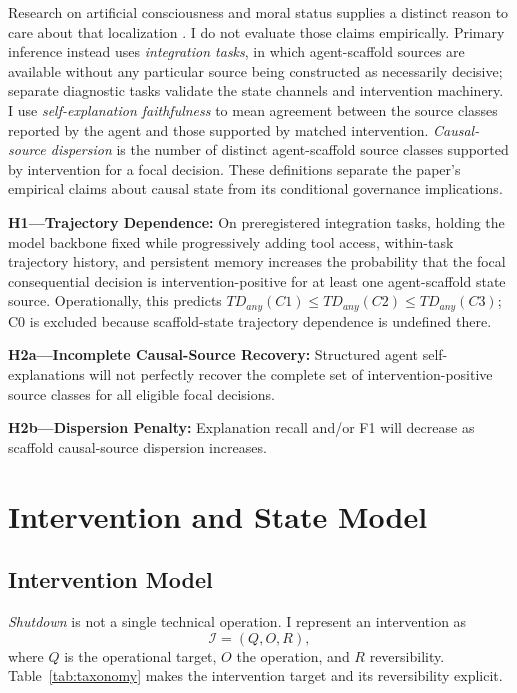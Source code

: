 \documentclass[conference]{IEEEtran}
\begin{document}
Research on artificial consciousness and moral status supplies a distinct reason to care about that localization \cite{b15,b16,b17}. I do not evaluate those claims empirically. Primary inference instead uses \emph{integration tasks}, in which agent-scaffold sources are available without any particular source being constructed as necessarily decisive; separate diagnostic tasks validate the state channels and intervention machinery. I use \emph{self-explanation faithfulness} to mean agreement between the source classes reported by the agent and those supported by matched intervention. \emph{Causal-source dispersion} is the number of distinct agent-scaffold source classes supported by intervention for a focal decision. These definitions separate the paper's empirical claims about causal state from its conditional governance implications.

\textbf{H1---Trajectory Dependence:} On preregistered integration tasks, holding the model backbone fixed while progressively adding tool access, within-task trajectory history, and persistent memory increases the probability that the focal consequential decision is intervention-positive for at least one agent-scaffold state source. Operationally, this predicts $TD_{any}(C1) \leq TD_{any}(C2) \leq TD_{any}(C3)$; C0 is excluded because scaffold-state trajectory dependence is undefined there.

\textbf{H2a---Incomplete Causal-Source Recovery:} Structured agent self-explanations will not perfectly recover the complete set of intervention-positive source classes for all eligible focal decisions.

\textbf{H2b---Dispersion Penalty:} Explanation recall and/or F1 will decrease as scaffold causal-source dispersion increases.

\section{Intervention and State Model}
\subsection{Intervention Model}
\textit{Shutdown} is not a single technical operation. I represent an intervention as
\begin{equation}
\mathcal{I}=(Q,O,R),
\label{eq:intervention}
\end{equation}
where $Q$ is the operational target, $O$ the operation, and $R$ reversibility. Table~\ref{tab:taxonomy} makes the intervention target and its reversibility explicit.
\end{document}
